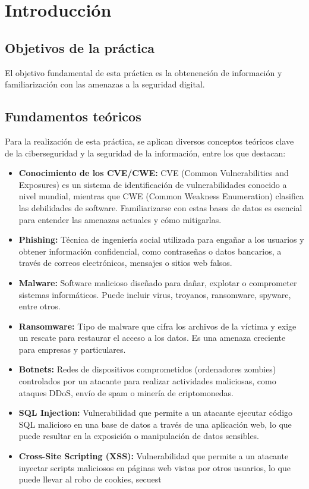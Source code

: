 \chapter{Introducción}

\section{Objetivos de la práctica}
El objetivo fundamental de esta práctica es la obtenención de información y 
familiarización con las amenazas a la seguridad digital.

\section{Fundamentos teóricos}
Para la realización de esta práctica, se aplican diversos conceptos teóricos clave 
de la ciberseguridad y la seguridad de la información, entre los que destacan:
\begin{itemize}
    \item \textbf{Conocimiento de los CVE/CWE:} CVE (Common Vulnerabilities and Exposures) es un sistema de identificación de vulnerabilidades conocido a nivel mundial, mientras que CWE (Common Weakness Enumeration) clasifica las debilidades de software. Familiarizarse con estas bases de datos es esencial para entender las amenazas actuales y cómo mitigarlas.
    \item \textbf{Phishing:} Técnica de ingeniería social utilizada para engañar a los usuarios y obtener información confidencial, como contraseñas o datos bancarios, a través de correos electrónicos, mensajes o sitios web falsos.
    \item \textbf{Malware:} Software malicioso diseñado para dañar, explotar o comprometer sistemas informáticos. Puede incluir virus, troyanos, ransomware, spyware, entre otros.
    \item \textbf{Ransomware:} Tipo de malware que cifra los archivos de la víctima y exige un rescate para restaurar el acceso a los datos. Es una amenaza creciente para empresas y particulares.
    \item \textbf{Botnets:} Redes de dispositivos comprometidos (ordenadores zombies) controlados por un atacante para realizar actividades maliciosas, como ataques DDoS, envío de spam o minería de criptomonedas.
    \item \textbf{SQL Injection:} Vulnerabilidad que permite a un atacante ejecutar código SQL malicioso en una base de datos a través de una aplicación web, lo que puede resultar en la exposición o manipulación de datos sensibles.
    \item \textbf{Cross-Site Scripting (XSS):} Vulnerabilidad que permite a un atacante inyectar scripts maliciosos en páginas web vistas por otros usuarios, lo que puede llevar al robo de cookies, secuest
\end{itemize}

